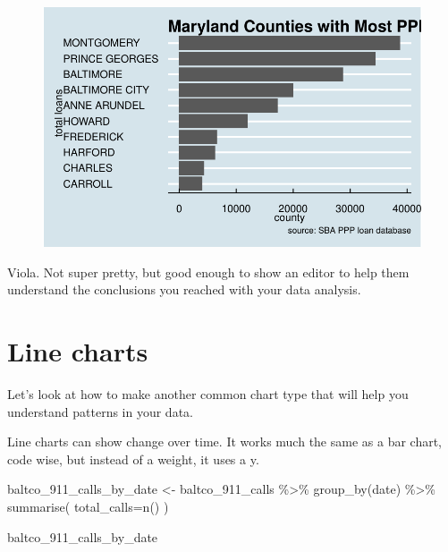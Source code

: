 \documentclass[
  letterpaper,
  DIV=11,
  numbers=noendperiod]{scrreprt}
\newenvironment{Shaded}{\begin{snugshade}}{\end{snugshade}}
\newcommand{\AttributeTok}[1]{\textcolor[rgb]{0.40,0.45,0.13}{#1}}
\newcommand{\FunctionTok}[1]{\textcolor[rgb]{0.28,0.35,0.67}{#1}}
\newcommand{\NormalTok}[1]{\textcolor[rgb]{0.00,0.23,0.31}{#1}}
\newcommand{\OtherTok}[1]{\textcolor[rgb]{0.00,0.23,0.31}{#1}}
\newcommand{\SpecialCharTok}[1]{\textcolor[rgb]{0.37,0.37,0.37}{#1}}
\begin{document}
\begin{figure}[H]

{\centering \includegraphics{./visualizing-for-reporting_files/figure-pdf/unnamed-chunk-11-1.pdf}

}

\end{figure}

Viola. Not super pretty, but good enough to show an editor to help them
understand the conclusions you reached with your data analysis.

\hypertarget{line-charts}{%
\section{Line charts}\label{line-charts}}

Let's look at how to make another common chart type that will help you
understand patterns in your data.

Line charts can show change over time. It works much the same as a bar
chart, code wise, but instead of a weight, it uses a y.

\begin{Shaded}
\begin{Highlighting}[]
\NormalTok{baltco\_911\_calls\_by\_date }\OtherTok{\textless{}{-}}\NormalTok{ baltco\_911\_calls }\SpecialCharTok{\%\textgreater{}\%}
  \FunctionTok{group\_by}\NormalTok{(date) }\SpecialCharTok{\%\textgreater{}\%}
  \FunctionTok{summarise}\NormalTok{(}
    \AttributeTok{total\_calls=}\FunctionTok{n}\NormalTok{()}
\NormalTok{  )}

\NormalTok{baltco\_911\_calls\_by\_date}
\end{Highlighting}
\end{Shaded}
\end{document}
